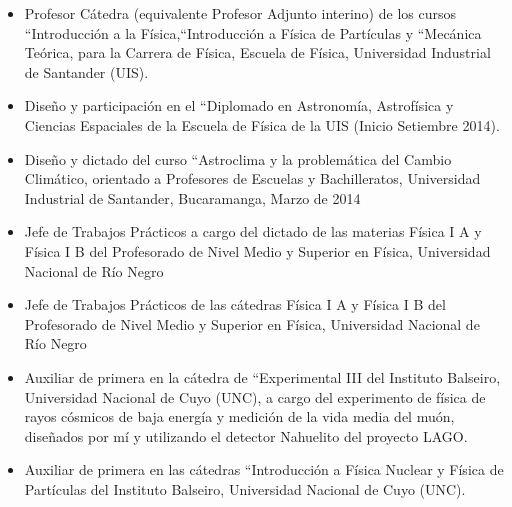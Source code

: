 \begin{itemize}
	\item {} Profesor Cátedra (equivalente Profesor Adjunto interino) de los cursos ``Introducción a la Física,``Introducción a Física de Partículas y ``Mecánica Teórica, para la Carrera de Física, Escuela de Física, Universidad Industrial de Santander (UIS).
    \item {} Diseño y participación en el ``Diplomado en Astronomía, Astrofísica y Ciencias Espaciales de la Escuela de Física de la UIS (Inicio Setiembre 2014).
	\item {} Diseño y dictado del curso ``Astroclima y la problemática del Cambio Climático, orientado a Profesores de Escuelas y Bachilleratos, Universidad Industrial de Santander, Bucaramanga, Marzo de 2014
	\item {} Jefe de Trabajos Prácticos a cargo del dictado de las materias Física I A y Física I B del Profesorado de Nivel Medio y Superior en Física, Universidad Nacional de Río Negro
	\item {} Jefe de Trabajos Prácticos de las cátedras Física I A y Física I B del Profesorado de Nivel Medio y Superior en Física, Universidad Nacional de Río Negro
	\item {} Auxiliar de primera en la cátedra de ``Experimental III del Instituto Balseiro, Universidad Nacional de Cuyo (UNC), a cargo del experimento de física de rayos cósmicos de baja energía y medición de la vida media del muón, diseñados por mí y utilizando el detector Nahuelito del proyecto LAGO\@.
	\item {} Auxiliar de primera en las cátedras ``Introducción a Física Nuclear y Física de Partículas del Instituto Balseiro, Universidad Nacional de Cuyo (UNC).
\fi
\end{itemize}
\fi